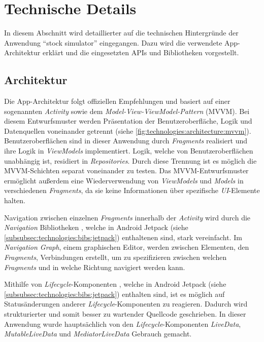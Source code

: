 \documentclass[a4paper]{article}
\begin{document}
\section{Technische Details}
\label{sec:technologies}
In diesem Abschnitt wird detaillierter auf die technischen Hintergründe der Anwendung "`stock simulator"' eingegangen.
Dazu wird die verwendete App-Architektur erklärt und die eingesetzten APIs und Bibliotheken vorgestellt.


\subsection{Architektur}
\label{subsec:technologies:architecture}
Die App-Architektur folgt offiziellen Empfehlungen \autocite{google_recommendations} und basiert auf einer sogenannten \textit{Activity} sowie dem \textit{Model-View-ViewModel-Pattern} (MVVM).
Bei diesem Entwurfsmuster werden Präsentation der Benutzeroberfläche, Logik und Datenquellen voneinander getrennt (siehe \autoref{fig:technologies:architecture:mvvm}).
Benutzeroberflächen sind in dieser Anwendung durch \textit{Fragments} realisiert und ihre Logik in \textit{ViewModels} implementiert.
Logik, welche von Benutzeroberflächen unabhängig ist, residiert in \textit{Repositories}.
Durch diese Trennung ist es möglich die MVVM-Schichten separat voneinander zu testen.
Das MVVM-Entwurfsmuster ermöglicht außerdem eine Wiederverwendung von \textit{ViewModels} und \textit{Models} in verschiedenen \textit{Fragments}, da sie keine Informationen über spezifische \textit{UI}-Elemente halten.

Navigation zwischen einzelnen \textit{Fragments} innerhalb der \textit{Activity} wird durch die \textit{Navigation} Bibliotheken \autocite{android_navigation}, welche in Android Jetpack (siehe \autoref{subsubsec:technologies:bibs:jetpack}) enthaltenen sind, stark vereinfacht.
Im \textit{Navigation Graph}, einem graphischen Editor, werden zwischen Elementen, den \textit{Fragments}, Verbindungen erstellt, um zu spezifizieren zwischen welchen \textit{Fragments} und in welche Richtung navigiert werden kann.

Mithilfe von \textit{Lifecycle}-Komponenten \autocite{android_lifecycle}, welche in Android Jetpack (siehe \autoref{subsubsec:technologies:bibs:jetpack}) enthalten sind, ist es möglich auf Statusänderungen anderer \textit{Lifecycle}-Komponenten zu reagieren.
Dadurch wird strukturierter und somit besser zu wartender Quellcode geschrieben.
In dieser Anwendung wurde hauptsächlich von den \textit{Lifecycle}-Komponenten \textit{LiveData}, \textit{MutableLiveData} und \textit{MediatorLiveData} Gebrauch gemacht.
\end{document}
